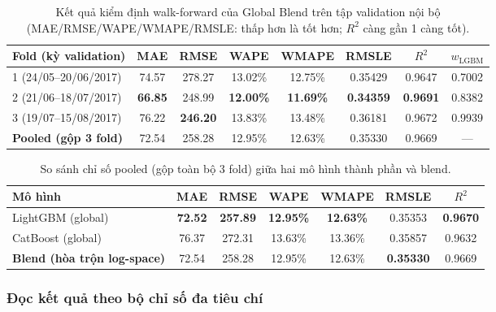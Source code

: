 \documentclass[12pt,a4paper]{report}
\begin{document}
\begin{table}[H]
\centering
\small
\begin{tabular}{@{}lccccccc@{}}
\toprule
\textbf{Fold (kỳ validation)} & \textbf{MAE} & \textbf{RMSE} & \textbf{WAPE} & \textbf{WMAPE} & \textbf{RMSLE} & $R^2$ & $w_{\mathrm{LGBM}}$ \\
\midrule
1 (24/05--20/06/2017) & 74.57 & 278.27 & 13.02\% & 12.75\% & 0.35429 & 0.9647 & 0.7002 \\
2 (21/06--18/07/2017) & \textbf{66.85} & 248.99 & \textbf{12.00\%} & \textbf{11.69\%} & \textbf{0.34359} & \textbf{0.9691} & 0.8382 \\
3 (19/07--15/08/2017) & 76.22 & \textbf{246.20} & 13.83\% & 13.48\% & 0.36181 & 0.9672 & 0.9939 \\
\midrule
\textbf{Pooled (gộp 3 fold)} & 72.54 & 258.28 & 12.95\% & 12.63\% & 0.35330 & 0.9669 & --- \\
\bottomrule
\end{tabular}
\caption{Kết quả kiểm định walk-forward của Global Blend trên tập validation nội bộ (MAE/RMSE/WAPE/WMAPE/RMSLE: thấp hơn là tốt hơn; $R^2$ càng gần 1 càng tốt).}
\label{tab:folds}
\end{table}

\begin{table}[H]
\centering
\small
\begin{tabular}{@{}lcccccc@{}}
\toprule
\textbf{Mô hình} & \textbf{MAE} & \textbf{RMSE} & \textbf{WAPE} & \textbf{WMAPE} & \textbf{RMSLE} & $R^2$ \\
\midrule
LightGBM (global) & \textbf{72.52} & \textbf{257.89} & \textbf{12.95\%} & \textbf{12.63\%} & 0.35353 & \textbf{0.9670} \\
CatBoost (global) & 76.37 & 272.31 & 13.63\% & 13.36\% & 0.35857 & 0.9632 \\
\textbf{Blend (hòa trộn log-space)} & 72.54 & 258.28 & 12.95\% & 12.63\% & \textbf{0.35330} & 0.9669 \\
\bottomrule
\end{tabular}
\caption{So sánh chỉ số pooled (gộp toàn bộ 3 fold) giữa hai mô hình thành phần và blend.}
\label{tab:pooled}
\end{table}

\subsubsection{Đọc kết quả theo bộ chỉ số đa tiêu chí}
\end{document}
